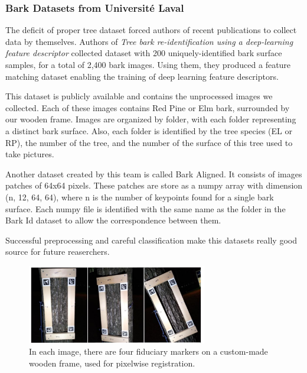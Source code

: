\documentclass[../Main.tex]{subfiles}
\begin{document}
    \subsubsection{Bark Datasets from Université Laval}
    The deficit of proper tree dataset forced authors of recent publications to collect data by themselves. Authors of \textit{Tree bark re-identification using a deep-learning feature descriptor} \cite{Robert2020BarkRe-Id} collected dataset with 200 uniquely-identified bark surface samples, for a total of 2,400 bark images. Using them, they produced a feature matching dataset enabling the training of deep learning feature descriptors.
    
    This dataset is publicly available and contains the unprocessed images we collected. Each of these images contains Red Pine or Elm bark, surrounded by our wooden frame. Images are organized by folder, with each folder representing a distinct bark surface. Also, each folder is identified by the tree species (EL or RP), the number of the tree, and the number of the surface of this tree used to take pictures.
    
    Another dataset created by this team is called Bark Aligned. It consists of images patches of 64x64 pixels. These patches are store as a numpy array with dimension (n, 12, 64, 64), where n is the number of keypoints found for a single bark surface. Each numpy file is identified with the same name as the folder in the Bark Id dataset to allow the correspondence between them. 
    
    Successful preprocessing and careful classification make this datasets really good source for future reaserchers.
    
    \begin{figure}[ht]
        \centering
        \includegraphics[width=0.7\textwidth]{Images/datasets/04_laval_shot.png}
        \caption{In each image, there are four fiduciary markers on a custom-made wooden frame, used for pixelwise registration.\cite{Robert2020BarkRe-Id}}
            \label{fig:04_laval_shot}
    \end{figure}

\newpage    

\biblio %
\end{document}
